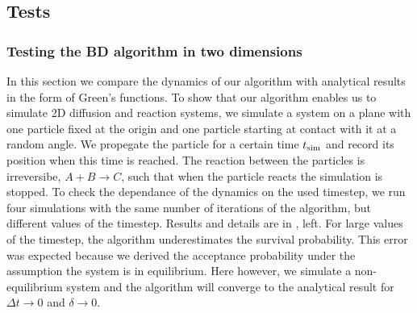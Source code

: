 \subsection{Tests}

\subsubsection{Testing the BD algorithm in two dimensions}

In this section we compare the dynamics of our algorithm with analytical results in the form of Green's functions. To show that our algorithm enables us to simulate 2D diffusion and reaction systems, we simulate a system on a plane with one particle fixed at the origin and one particle starting at contact with it at a random angle. We propegate the particle for a certain time $t_{\rm sim}$ and record its position when this time is reached. The reaction between the particles is irreversibe, $A + B \to C$, such that when the particle reacts the simulation is stopped. To check the dependance of the dynamics on the used timestep, we run four simulations with the same number of iterations of the algorithm, but different values of the timestep. Results and details are in , left. For large values of the timestep, the algorithm underestimates the survival probability. This error was expected because we derived the acceptance probability under the assumption the system is in equilibrium. Here however, we simulate a non-equilibrium system and the algorithm will converge to the analytical result for $\Delta t \to 0$ and $\delta \to 0$.

